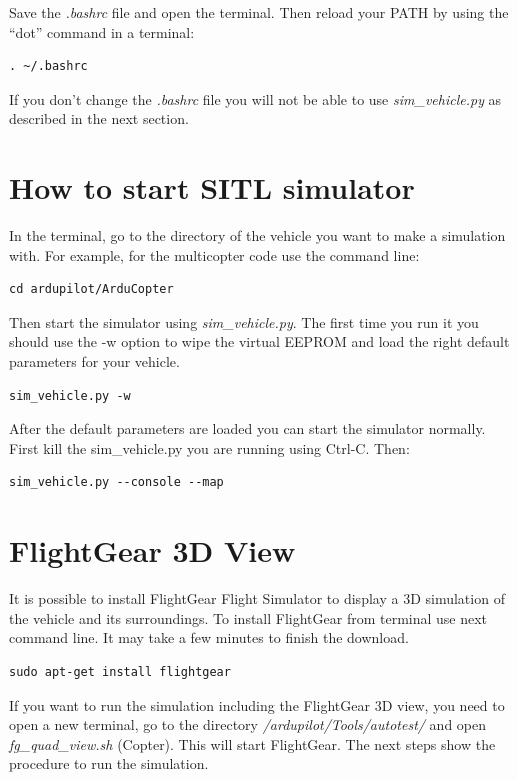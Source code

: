 Save the \textit{.bashrc} file and open the terminal. Then reload your PATH by using the “dot” command in a terminal:

\begin{verbatim} 
. ~/.bashrc
\end{verbatim}
If you don't change the  \textit{.bashrc} file you will not be able to use \textit{sim\_vehicle.py} as described in the next section.

\section{How to start SITL simulator}
In the terminal, go to the directory of the vehicle you want to make a simulation with. For example, for the multicopter code use the command line:
\begin{verbatim}
cd ardupilot/ArduCopter
\end{verbatim}

Then start the simulator using \textit{sim\_vehicle.py}. The first time you run it you should use the -w option to wipe the virtual EEPROM and load the right default parameters for your vehicle.
\begin{verbatim}
sim_vehicle.py -w
\end{verbatim}

After the default parameters are loaded you can start the simulator normally. First kill the sim\_vehicle.py you are running using Ctrl-C. Then:
\begin{verbatim}
sim_vehicle.py --console --map
\end{verbatim}

\section{FlightGear 3D View}  \label{sec_flightgear_view}

It is possible to install FlightGear Flight Simulator to display a 3D simulation of the vehicle and its surroundings. To install FlightGear from terminal use next command line. It may take a few minutes to finish the download.

\begin{verbatim}
sudo apt-get install flightgear
\end{verbatim}

If you want to run the simulation including the FlightGear 3D view, you need to open a new terminal, go to the directory \textit{/ardupilot/Tools/autotest/} and open \textit{fg\_quad\_view.sh} (Copter). This will start FlightGear. The next steps show the procedure to run the simulation.

